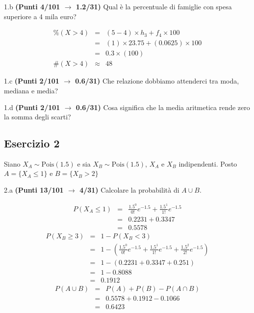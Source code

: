 \documentclass[
  11pt,
]{book}
\theoremstyle{mytheoremstyle}
\theoremstyle{mydefstyle}
\newenvironment{sol}
  {
  \begin{tcolorbox}[enhanced,breakable,arc=0.1mm,boxrule=1pt,colback=white,colframe=iblue,
  title=\bf \fontfamily{lmss}\selectfont \hspace{.5 cm} Soluzione,drop fuzzy shadow]

}{
\end{tcolorbox}
  }
\begin{document}
1.b \textbf{(Punti 4/101 \(\rightarrow\) 1.2/31)} Qual è la percentuale di famiglie con spesa superiore a 4 mila euro?

\begin{sol}
\begin{eqnarray*}
     \%(X> 4 ) &=& ( 5 - 4 )\times h_{ 3 }+ f_{ 4 }\times 100 \\
              &=& ( 1 )\times 23.75 + ( 0.0625 )\times 100 \\
              &=&  0.3 \times(100)\\
     \#(X> 4 ) &\approx& 48 
         \end{eqnarray*}

\end{sol}

1.c \textbf{(Punti 2/101 \(\rightarrow\) 0.6/31)} Che relazione dobbiamo attenderci tra moda, mediana e media?

1.d \textbf{(Punti 2/101 \(\rightarrow\) 0.6/31)} Cosa significa che la media aritmetica rende zero la somma degli scarti?

\subsection{Esercizio 2}\label{esercizio-2-25}

Siano \(X_A\sim \text{Pois}(1.5)\) e sia \(X_B\sim \text{Pois}(1.5)\), \(X_A\) e \(X_B\) indipendenti. Posto \(A=\{X_A\le 1\}\) e \(B=\{X_B>2\}\)

2.a \textbf{(Punti 13/101 \(\rightarrow\) 4/31)} Calcolare la probabilità di \(A\cup B\).

\begin{sol}
\begin{eqnarray*}
   P( X_A \leq 1 ) &=& \frac{ 1.5 ^{ 0 }}{ 0 !}e^{- 1.5 }+\frac{ 1.5 ^{ 1 }}{ 1 !}e^{- 1.5 } \\                 &=& 0.2231+0.3347 \\                 &=& 0.5578 
\end{eqnarray*}
\begin{eqnarray*}
   P( X_B \geq 3 ) &=& 1-P( X_B < 3 ) \\                 &=& 1-\left( \frac{ 1.5 ^{ 0 }}{ 0 !}e^{- 1.5 }+\frac{ 1.5 ^{ 1 }}{ 1 !}e^{- 1.5 }+\frac{ 1.5 ^{ 2 }}{ 2 !}e^{- 1.5 } \right)\\                 &=& 1-( 0.2231+0.3347+0.251 )\\                 &=& 1- 0.8088 \\                 &=&   0.1912 
\end{eqnarray*}
\begin{eqnarray*}
  P(A\cup B) &=&  P(A)+P(B)-P(A\cap B)\\
  &=& 0.5578+0.1912-0.1066\\
  &=& 0.6423
\end{eqnarray*}

\end{sol}
\end{document}
